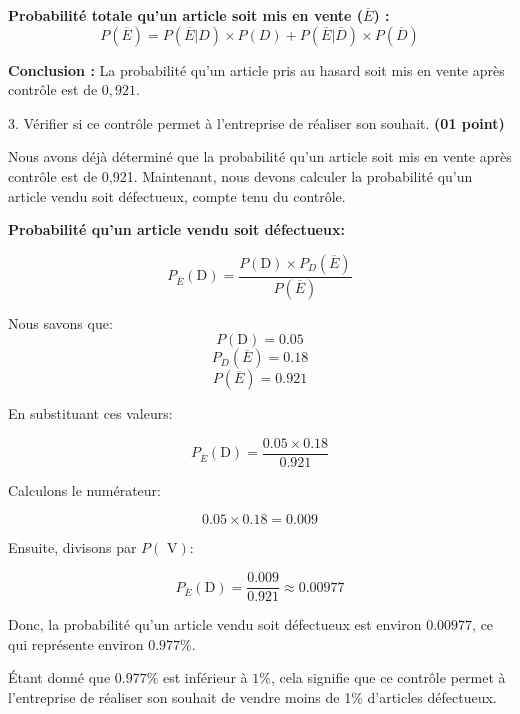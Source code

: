 \documentclass[12pt]{article}
\begin{document}
\textbf{Probabilité totale qu'un article soit mis en vente (\(\overline{E}\)) :}
\[
P(\overline{E}) = P(\overline{E}|D) \times P(D) + P(\overline{E}|\overline{D}) \times P(\overline{D})
\]



\begin{center}
\textcolor{green}{}
\end{center}

\textbf{Conclusion :} La probabilité qu'un article pris au hasard soit mis en vente après contrôle est de \(0,921\).

3. Vérifier si ce contrôle permet à l’entreprise de réaliser son souhait. \textbf{(01 point)}
    
    Nous avons déjà déterminé que la probabilité qu'un article soit mis en vente après contrôle est de 0,921. Maintenant, nous devons calculer la probabilité qu'un article vendu soit défectueux, compte tenu du contrôle.

    \textbf{Probabilité qu'un article vendu soit défectueux:}

    \[
    P_{\overline{E}}(\text{D}) = \frac{P(\text{D}) \times P_{D}(\overline{E})}{P(\overline{E})}
    \]

    Nous savons que:
    \[
    P(\text{D}) = 0.05
    \]
    \[
    P_{D}(\overline{E}) = 0.18
    \]
    \[
    P(\overline{E}) = 0.921
    \]

    En substituant ces valeurs:

    \[
    P_{\overline{E}}(\text{D}) = \frac{0.05 \times 0.18}{0.921}
    \]

    Calculons le numérateur:

    \[
    0.05 \times 0.18 = 0.009
    \]

    Ensuite, divisons par \(P(\text{ V})\):

    \[
    P_{\overline{E}}(\text{D}) = \frac{0.009}{0.921} \approx 0.00977
    \]

    Donc, la probabilité qu'un article vendu soit défectueux est environ \(0.00977\), ce qui représente environ \(0.977\%\).

    Étant donné que \(0.977\%\) est inférieur à \(1\%\), cela signifie que ce contrôle permet à l'entreprise de réaliser son souhait de vendre moins de 1\% d'articles défectueux.
\end{document}
